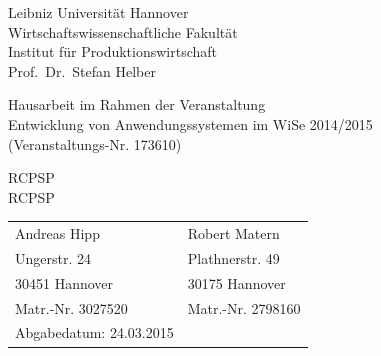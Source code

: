 \documentclass[a4paper,12pt,parskip,bibtotoc,liststotoc]{article}
\begin{document}
%
%
\thispagestyle{empty}  %
Leibniz Universität Hannover\\
Wirtschaftswissenschaftliche Fakultät\\
Institut für Produktionswirtschaft\\
Prof.\ Dr.\ Stefan Helber

\vspace{5cm}

\begin{center}
Hausarbeit im Rahmen der Veranstaltung \\
Entwicklung von Anwendungssystemen  im WiSe 2014/2015 \\
(Veranstaltungs-Nr. 173610)

\vspace{2.5cm}

{\Large RCPSP \\
RCPSP}
\end{center}

\vspace{5.5cm}


\begin{table}[h!]
    \vspace*{-3mm}
    \hspace*{2mm}
  \renewcommand{\arraystretch}{1,5}
    \begin{tabular}{ll}
Andreas Hipp &Robert Matern \\
Ungerstr. 24&Plathnerstr. 49 \\
30451 Hannover&30175 Hannover \\
Matr.-Nr. 3027520 &Matr.-Nr. 2798160 \\[3mm]
Abgabedatum: 24.03.2015
	\end{tabular}
\end{table}

\newpage

\tableofcontents

\newpage  %

\listoffigures
\end{document}
